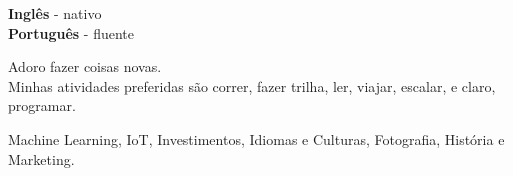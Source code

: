 \documentclass[9pt]{developercv} %
\begin{document}

\begin{minipage}[t]{0.3\textwidth}
	\vspace{-\baselineskip} %


	\textbf{Inglês} - nativo \\
	\textbf{Português} - fluente
\end{minipage}
\hfill
\begin{minipage}[t]{0.3\textwidth}
	\vspace{-\baselineskip} %
	

	Adoro fazer coisas novas. \\
	Minhas atividades preferidas são correr, fazer trilha, 
	ler, viajar, escalar, e claro, programar. 
	
\end{minipage}
\hfill
\begin{minipage}[t]{0.3\textwidth}
	\vspace{-\baselineskip} %
	

	Machine Learning, IoT, Investimentos, Idiomas e Culturas, 
	Fotografia, História e Marketing. 
	
\end{minipage}

\end{document}

